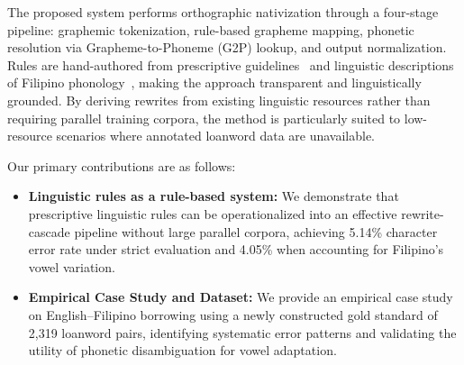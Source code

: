The proposed system performs orthographic nativization through a four-stage
pipeline: graphemic tokenization, rule-based grapheme mapping, phonetic
resolution via Grapheme-to-Phoneme (G2P) lookup, and output normalization.
Rules are hand-authored from prescriptive guidelines~\cite{almario2014} and
linguistic descriptions of Filipino
phonology~\cite{llamzon1966,schachter1972,llamzon1997,tayao2004,magpale2024},
making the approach transparent and linguistically grounded. By deriving
rewrites from existing linguistic resources rather than requiring parallel
training corpora, the method is particularly suited to low-resource scenarios
where annotated loanword data are unavailable.

Our primary contributions are as follows:
\begin{itemize}
    \item \textbf{Linguistic rules as a rule-based system:} We demonstrate that
          prescriptive linguistic rules can be operationalized into an effective
          rewrite-cascade pipeline without large parallel corpora, achieving 5.14\%
          character error rate under strict evaluation and 4.05\% when accounting for
          Filipino's vowel variation.

    \item \textbf{Empirical Case Study and Dataset:} We provide an empirical
          case study on English--Filipino borrowing using a newly constructed gold
          standard of 2,319 loanword pairs, identifying systematic error patterns and
          validating the utility of phonetic disambiguation for vowel adaptation.
\end{itemize}
